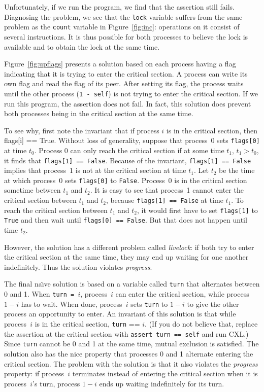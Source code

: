 \documentclass{report}
\begin{document}
Unfortunately, if we run the program, we find that the assertion still
fails.  Diagnosing the problem, we see that the \texttt{lock} variable
suffers from the same problem as the \texttt{count} variable
in Figure~\ref{fig:inc}: operations
on it consist of several instructions.  It is thus possible
for both processes to believe the lock is available and to obtain the lock
at the same time.

Figure~\ref{fig:upflags} presents a solution based on each process having
a flag indicating that it is trying to enter the critical section.
A process can write its own flag and read the flag of its peer.
After setting its flag, the process waits until the other process
(\texttt{1 - self}) is not trying to enter the critical section.
If we run this program, the assertion does not fail.  In fact, this
solution does prevent both processes being in the critical section at
the same time.

To see why, first note the invariant that if process $i$ is in the
critical section, then flags[i] == True.
Without loss of generality,
suppose that process~0 sets \texttt{flags[0]} at time $t_0$.
Process 0 can only reach the critical section if at some time $t_1$,
$t_1 > t_0$, it finds that \texttt{flags[1] == False}.
Because of the invariant, \texttt{flags[1] == False} implies that
process~1 is not at the critical section at time $t_1$.
Let $t_2$ be the time at which process~0 sets \texttt{flags[0]}
to \texttt{False}.  Process~0 is in the critical section sometime
between $t_1$ and $t_2$.
It is easy to see that process~1 cannot enter the critical section
between $t_1$ and $t_2$, because \texttt{flags[1] == False} at
time $t_1$.  To reach the critical section between $t_1$ and $t_2$,
it would first have to set \texttt{flags[1]} to \texttt{True} and
then wait until \texttt{flags[0] == False}.  But that does not happen
until time $t_2$.

However, the solution has a different problem called \emph{livelock}:
if both try to enter the critical section at the same time, they may
end up waiting for one another indefinitely.  Thus the solution
violates \emph{progress}.

The final na\"{\i}ve solution is based on a variable called \texttt{turn}
that alternates between 0 and 1.  When \texttt{turn = $i$}, process~$i$ can
enter the critical section, while process $1-i$ has to wait.  When done,
process~$i$ sets \texttt{turn} to $1-i$ to give the other process an
opportunity to enter.
An invariant of this solution is that while process~$i$ is in the critical
section, \texttt{turn} == $i$.
(If you do not believe that, replace the assertion at the critical
section with \texttt{assert turn == self} and run CXL.)
Since \texttt{turn} cannot be 0 and 1 at
the same time, mutual exclusion is satisfied.
The solution also has the nice property that
processes 0 and 1 alternate entering the critical section.
The problem with the solution is
that it also violates the \emph{progress} property:
if process~$i$ terminates instead of entering the critical section when it
is process~$i$'s turn, process $1-i$ ends up waiting indefinitely for its
turn.
\end{document}

